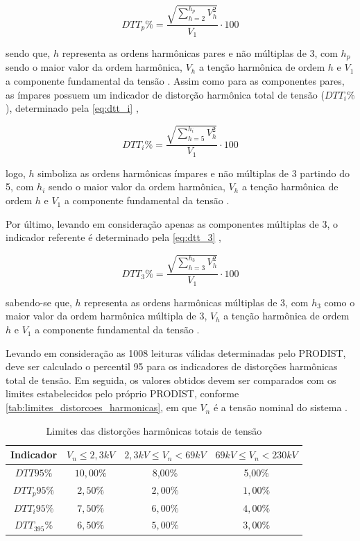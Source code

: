 \begin{equation}
  DTT_p\% = \frac{\sqrt{\sum_{h=2}^{h_{p}}V_h^2}}{V_1}\cdot 100
  \label{eq:dtt_p}
\end{equation}

\noindent
sendo que, $h$ representa as ordens harmônicas pares e não múltiplas de 3, com $h_p$ sendo o maior valor da ordem harmônica, $V_h$ a tenção harmônica de ordem $h$ e $V_1$ a componente fundamental da tensão \cite{ref:ANEEL2021}.
Assim como para as componentes pares, as ímpares possuem um indicador de distorção harmônica total de tensão ($DTT_i\%$), determinado pela \autoref{eq:dtt_i} \cite{ref:ANEEL2021},

\begin{equation}
  DTT_i\% = \frac{\sqrt{\sum_{h=5}^{h_{i}}V_h^2}}{V_1}\cdot 100
  \label{eq:dtt_i}
\end{equation}

\noindent
logo, $h$ simboliza as ordens harmônicas ímpares e não múltiplas de 3 partindo do 5, com $h_i$ sendo o maior valor da ordem harmônica, $V_h$ a tenção harmônica de ordem $h$ e $V_1$ a componente fundamental da tensão \cite{ref:ANEEL2021}.

Por último, levando em consideração apenas as componentes múltiplas de 3, o indicador referente é determinado pela \autoref{eq:dtt_3} \cite{ref:ANEEL2021},

\begin{equation}
  DTT_3\% = \frac{\sqrt{\sum_{h=3}^{h_{3}}V_h^2}}{V_1}\cdot 100
  \label{eq:dtt_3}
\end{equation}

\noindent
sabendo-se que, $h$ representa as ordens harmônicas múltiplas de 3, com $h_3$ como o maior valor da ordem harmônica múltipla de 3, $V_h$ a tenção harmônica de ordem $h$ e $V_1$ a componente fundamental da tensão \cite{ref:ANEEL2021}.

Levando em consideração as 1008 leituras válidas determinadas pelo PRODIST, deve ser calculado o percentil 95 para os indicadores de distorções harmônicas total de tensão. Em seguida, os valores obtidos devem ser comparados com os limites estabelecidos pelo próprio PRODIST, conforme \autoref{tab:limites_distorcoes_harmonicas}, em que $V_n$ é a tensão nominal do sistema \cite{ref:ANEEL2021}.

\begin{table}[H]
  \centering
  \caption{Limites das distorções harmônicas totais de tensão}
  \label{tab:limites_distorcoes_harmonicas}
  \begin{tabular}{@{}cccc@{}}
  \toprule
  \textbf{Indicador} & \textbf{$V_n\leq 2,3 kV$} & \textbf{$2,3 kV\leq V_n<69 kV$} & \textbf{$69 kV\leq V_n<230 kV$} \\ \midrule
  $DTT95\%$ & $10,00\%$ & 8,00\% & 5,00\% \\
  $DTT_p95\%$ & $2,50\%$ & $2,00\%$ & $1,00\%$ \\
  $DTT_i95\%$ & $7,50\%$ & $6,00\%$ & $4,00\%$ \\
  $DTT_395\%$ & $6,50\%$ & $5,00\%$ & $3,00\%$ \\ \bottomrule
  \end{tabular}
\end{table}

